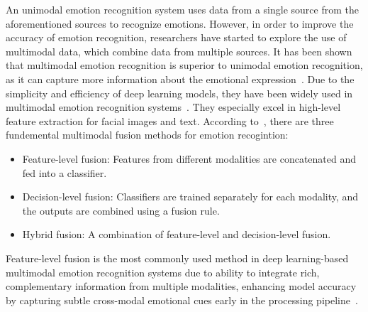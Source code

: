 \documentclass{article}
\begin{document}
An unimodal emotion recognition system uses data from a single source from the
aforementioned sources to recognize emotions. However, in order to improve the accuracy of
emotion recognition, researchers have started to explore the use of multimodal data, which
combine data from multiple sources. It has been shown that multimodal emotion recognition
is superior to unimodal emotion recognition, as it can capture more information about the
emotional expression~\cite{multimodal-review, unimodal-to-multimodal}. Due to the
simplicity and efficiency of deep learning models, they have been widely used in multimodal
emotion recognition systems~\cite{multimodal-review, unimodal-to-multimodal}. They
especially excel in high-level feature extraction for facial images and text.
According to~\cite{multimodal-review},
there are three fundemental multimodal fusion methods for emotion recogintion:
\begin{itemize}
    \item Feature-level fusion: Features from different modalities are concatenated and fed into a classifier.
    \item Decision-level fusion: Classifiers are trained separately for each modality,
    and the outputs are combined using a fusion rule.
    \item Hybrid fusion: A combination of feature-level and decision-level fusion.
\end{itemize}
Feature-level fusion is the most commonly used method in deep learning-based
multimodal emotion recognition systems due to ability to integrate rich, complementary information
from multiple modalities, enhancing model accuracy by capturing subtle cross-modal emotional
cues early in the processing pipeline~\cite{multimodal-review}.


\printbibliography[heading=bibintoc]

%     
\end{document}
